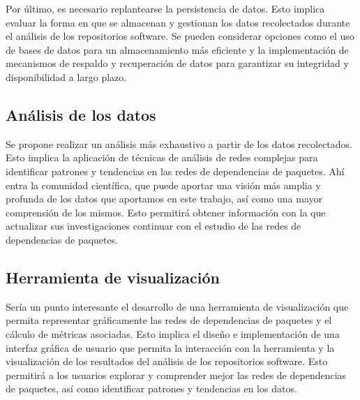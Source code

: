 Por último, es necesario replantearse la persistencia de datos. Esto implica evaluar la forma en que se almacenan y gestionan
los datos recolectados durante el análisis de los repositorios software. Se pueden considerar opciones como el uso de bases de
datos para un almacenamiento más eficiente y la implementación de mecanismos de respaldo y recuperación de datos para garantizar
su integridad y disponibilidad a largo plazo.

\subsection{Análisis de los datos}

Se propone realizar un análisis más exhaustivo a partir de los datos recolectados. Esto implica la aplicación de técnicas de análisis
de redes complejas para identificar patrones y tendencias en las redes de dependencias de paquetes. Ahí entra la comunidad científica, que puede
aportar una visión más amplia y profunda de los datos que aportamos en este trabajo, así como una mayor comprensión de los mismos. Esto permitirá
obtener información con la que actualizar sus investigaciones continuar con el estudio de las redes de dependencias de paquetes.

\subsection{Herramienta de visualización}

Sería un punto interesante el desarrollo de una herramienta de visualización que permita representar gráficamente las redes de dependencias
de paquetes y el cálculo de métricas asociadas. Esto implica el diseño e implementación de una interfaz gráfica de usuario que permita la
interacción con la herramienta y la visualización de los resultados del análisis de los repositorios software. Esto permitirá a los usuarios
explorar y comprender mejor las redes de dependencias de paquetes, así como identificar patrones y tendencias en los datos.
